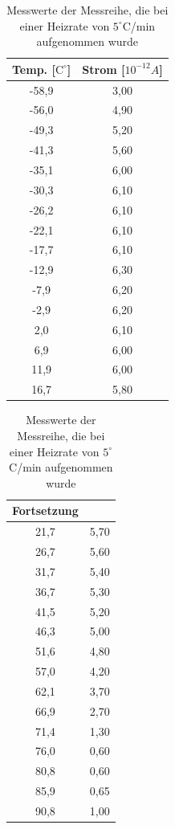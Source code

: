 \begin{table}
\begin{minipage}{0.45\textwidth}
\begin{tabular}{c|c}
Temp. [$\text{C}^\circ$] & Strom [$10^{-12}A$]\\\hline
-58,9	&3,00\\\hline
-56,0	&4,90\\\hline
-49,3	&5,20\\\hline
-41,3	&5,60\\\hline
-35,1	&6,00\\\hline
-30,3	&6,10\\\hline
-26,2	&6,10\\\hline
-22,1	&6,10\\\hline
-17,7	&6,10\\\hline
-12,9	&6,30\\\hline
-7,9	&6,20\\\hline
-2,9	&6,20\\\hline
2,0		&6,10\\\hline
6,9		&6,00\\\hline
11,9	&6,00\\\hline
16,7	&5,80\\\hline
\end{tabular}
\end{minipage}
\begin{minipage}{0.45\textwidth}
\begin{tabular}{c|c}
Fortsetzung & \\\hline
21,7	&5,70\\\hline
26,7	&5,60\\\hline
31,7	&5,40\\\hline
36,7	&5,30\\\hline
41,5	&5,20\\\hline
46,3	&5,00\\\hline
51,6	&4,80\\\hline
57,0	&4,20\\\hline
62,1	&3,70\\\hline
66,9	&2,70\\\hline
71,4	&1,30\\\hline
76,0	&0,60\\\hline
80,8	&0,60\\\hline
85,9	&0,65\\\hline
90,8	&1,00\\\hline
\end{tabular}
\end{minipage}
\caption{Messwerte der Messreihe, die bei einer Heizrate von $5^\circ$C/min aufgenommen wurde}
\label{tab_werte2}
\end{table}

